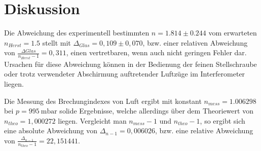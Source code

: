 \section{Diskussion}
Die Abweichung des experimentell bestimmten $n =1.814 \pm 0.244$ vom erwarteten $n_{Herst} = 1.5$ stellt mit $\Delta_{Glas} = 0,109 \pm 0,070$, bzw. einer relativen Abweichung von $\frac{\Delta{Glas}}{n_{Herst}-1} = 0,311$, einen vertretbaren, wenn auch nicht geringen Fehler dar. Ursachen für diese Abweichung können in der Bedienung der feinen Stellschraube oder trotz verwendeter Abschirmung auftretender Luftzüge im Interferometer liegen.

Die Messung des Brechungindexes von Luft ergibt mit konstant $n_{mess}=1.006298$ bei $p=\SI{995}{\milli\bar}$ solide Ergebnisse, welche allerdings über dem Theoriewert von $n_{theo}=1,000272$ \cite{Luftdruck} liegen. Vergleicht man $n_{mess}-1$ und $n_{theo}-1$, so ergibt sich eine absolute Abweichung von $\Delta_{n-1} = 0,006026$, bzw. eine relative Abweichung von $\frac{\Delta_{n-1}}{n_{theo}-1}=22,151441$.
